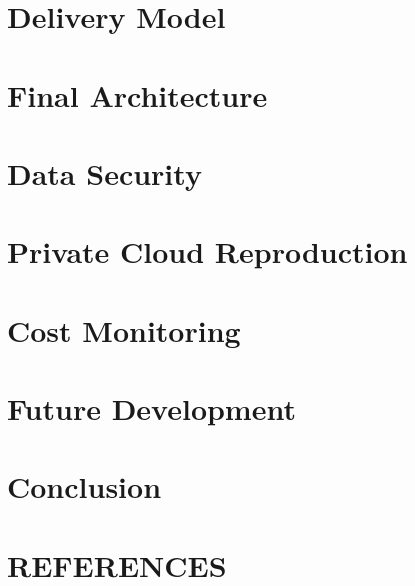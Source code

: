 \documentclass{scrreprt}
\begin{document}
\part{ Delivery Model}


\part{ Final Architecture }


\part{Data Security  }


% 

\part{ Private Cloud Reproduction }


\part{ Cost Monitoring }


\part{ Future Development }


\part{Conclusion}



\appendix
\newpage
\part{REFERENCES}

% 
% 
\end{document}
